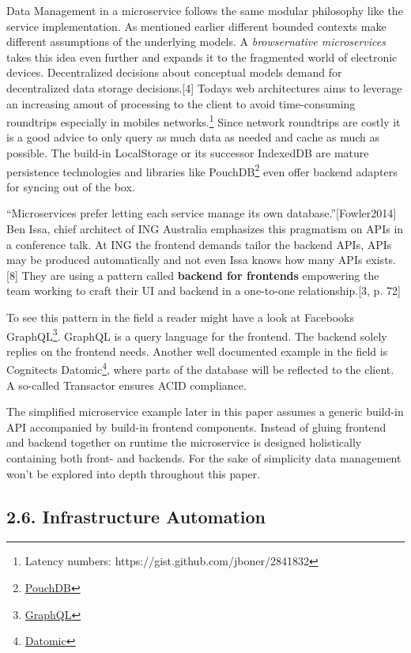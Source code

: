 \documentclass[]{article}
\begin{document}
Data Management in a microservice follows the same modular philosophy
like the service implementation. As mentioned earlier different bounded
contexts make different assumptions of the underlying models. A
\emph{browsernative microservices} takes this idea even further and
expands it to the fragmented world of electronic devices. Decentralized
decisions about conceptual models demand for decentralized data storage
decisions.{[}4{]} Todays web architectures aims to leverage an
increasing amout of processing to the client to avoid time-consuming
roundtrips especially in mobiles networks.\footnote{Latency numbers:
  https://gist.github.com/jboner/2841832} Since network roundtrips are
costly it is a good advice to only query as much data as needed and
cache as much as possible. The build-in LocalStorage or its successor
IndexedDB are mature persistence technologies and libraries like
PouchDB\footnote{\href{https://pouchdb.com/}{PouchDB}} even offer
backend adapters for syncing out of the box.

``Microservices prefer letting each service manage its own
database.''{[}Fowler2014{]} Ben Issa, chief architect of ING Australia
emphasizes this pragmatism on APIs in a conference talk. At ING the
frontend demands tailor the backend APIs, APIs may be produced
automatically and not even Issa knows how many APIs exists.{[}8{]} They
are using a pattern called \textbf{backend for frontends} empowering the
team working to craft their UI and backend in a one-to-one
relationship.{[}3, p. 72{]}

To see this pattern in the field a reader might have a look at Facebooks
GraphQL\footnote{\href{http://graphql.org/}{GraphQL}}. GraphQL is a
query language for the frontend. The backend solely replies on the
frontend needs. Another well documented example in the field is
Cognitects Datomic\footnote{\href{http://www.datomic.com/}{Datomic}},
where parts of the database will be reflected to the client. A so-called
Transactor ensures ACID compliance.

The simplified microservice example later in this paper assumes a
generic build-in API accompanied by build-in frontend components.
Instead of gluing frontend and backend together on runtime the
microservice is designed holistically containing both front- and
backends. For the sake of simplicity data management won't be explored
into depth throughout this paper.

\subsection{2.6. Infrastructure
Automation}\label{infrastructure-automation}
\end{document}

